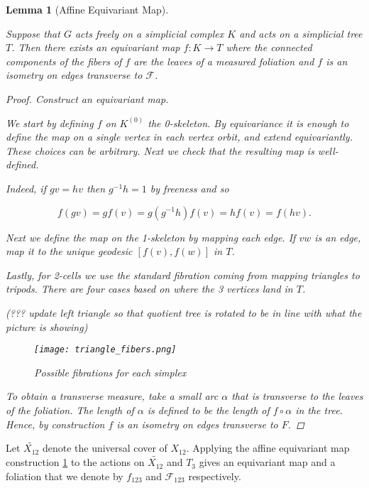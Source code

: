 \documentclass[12pt,parskip=full]{report}
\theoremstyle{plain}
\newtheorem{lem}[thm]{Lemma}
\theoremstyle{definition}
\begin{document}
\begin{lem}
    [Affine Equivariant Map]
    \label{lem:affineequivariantmap} 


    Suppose that \(G\) acts freely on a simplicial complex \(K\) and acts on a simplicial tree \(T\). Then there exists an equivariant map \(f: K \to T\) where the connected components of the fibers of \(f\) are the leaves of a measured foliation and \(f\) is an isometry on edges transverse to \(\mathscr{F}\).
    \begin{proof}
        Construct an equivariant map.

        We start by defining \(f\) on \(K^{(0)}\) the 0-skeleton. By equivariance it is enough to define the map on a single vertex in each vertex orbit, and extend equivariantly. These choices can be arbitrary. Next we check that the resulting map is well-defined. 
        
        Indeed, if \(gv=hv\) then \(g^{-1} h = 1\) by freeness and so
        
        \[ f(gv) = gf(v) = g(g^{-1}h)f(v) = hf(v) = f(hv). \]
        
        Next we define the map on the 1-skeleton by mapping each edge. If \(vw\) is an edge, map it to the unique geodesic \([f(v), f(w)]\) in \(T\).
        
        Lastly, for 2-cells we use the standard fibration coming from mapping triangles to tripods. There are four cases based on where the 3 vertices land in \(T\). 
        
(??? update left triangle so that quotient tree is rotated to be in line with what the picture is showing)        
\begin{figure}[htp]
    \centering
    \texttt{[image: triangle\_fibers.png]}
    \caption{Possible fibrations for each simplex}
    \label{fig:triangle_fibers}
\end{figure}
        
        To obtain a transverse measure, take a small arc \(\alpha\) that is transverse to the leaves of the foliation. The length of \(\alpha\) is defined to be the length of \(f \circ \alpha\) in the tree. Hence, by construction \(f\) is an isometry on edges transverse to \(F\).
    \end{proof}
\end{lem}


Let \(\widetilde {X_{12}}\) denote the universal cover of \(X_{12}\).  Applying the affine equivariant map construction \ref{lem:affineequivariantmap} to the actions on \(\widetilde {X_{12}}\) and \(T_{3}\) gives an equivariant  map and a foliation that we denote by \(f_{123}\) and \(\mathscr{F}_{123}\) respectively.
\end{document}
